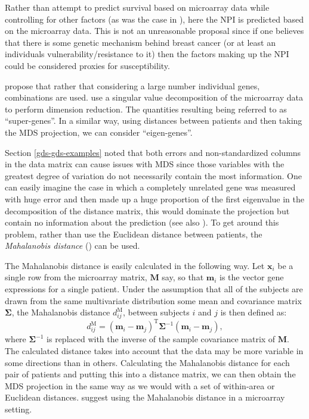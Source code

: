 Rather than attempt to predict survival based on microarray data while controlling for other factors (as was the case in \cite[pp. 240-245]{ernstbook}), here the NPI is predicted based on the microarray data. This is not an unreasonable proposal since if one believes that there is some genetic mechanism behind breast cancer (or at least an individuals vulnerability/resistance to it) then the factors making up the NPI could be considered proxies for susceptibility. 

 propose that rather that considering a large number individual genes, combinations are used.  use a singular value decomposition of the microarray data to perform dimension reduction. The quantities resulting being referred to as ``super-genes''. In a similar way, using distances between patients and then taking the MDS projection, we can consider ``eigen-genes''.

Section \ref{gds-gds-examples} noted that both errors and non-standardized columns in the data matrix can cause issues with MDS since those variables with the greatest degree of variation do not necessarily contain the most information. One can easily imagine the case in which a completely unrelated gene was measured with huge error and then made up a huge proportion of the first eigenvalue in the decomposition of the distance matrix, this would dominate the projection but contain no information about the prediction (see also \cite[pp. 220-221]{ernstbook}). To get around this problem, rather than use the Euclidean distance between patients, the \textit{Mahalanobis distance} (\cite{mahalanobis}) can be used.

The Mahalanobis distance is easily calculated in the following way. Let $\mathbf{x}_{i}$ be a single row from the microarray matrix, $\mathbf{M}$ say, so that $\mathbf{m}_{i}$ is the vector gene expressions for a single patient. Under the assumption that all of the subjects are drawn from the same multivariate distribution some mean and covariance matrix $\mathbf{\Sigma}$, the Mahalanobis distance $d^\text{M}_{ij}$, between subjects $i$ and $j$ is then defined as:
\begin{equation}
d^\text{M}_{ij} = (\mathbf{m}_{i} - \mathbf{m}_{j})^\text{T} \mathbf{\Sigma}^{-1} (\mathbf{m}_{i} - \mathbf{m}_{j}),
\end{equation}
where $\mathbf{\Sigma}^{-1}$ is replaced with the inverse of the sample covariance matrix of $\mathbf{M}$. The calculated distance takes into account that the data may be more variable in some directions than in others. Calculating the Mahalanobis distance for each pair of patients and putting this into a distance matrix, we can then obtain the MDS projection in the same way as we would with a set of within-area or Euclidean distances.  suggest using the Mahalanobis distance in a microarray setting.

